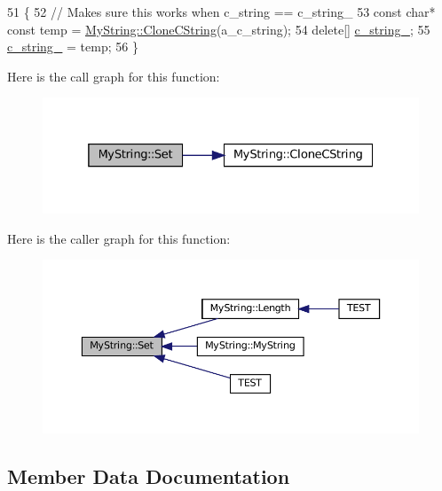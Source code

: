\begin{DoxyCode}
51                                          \{
52   \textcolor{comment}{// Makes sure this works when c\_string == c\_string\_}
53   \textcolor{keyword}{const} \textcolor{keywordtype}{char}* \textcolor{keyword}{const} temp = \hyperlink{classMyString_a40753dcfa3314a8993f32bdd75d67ce2}{MyString::CloneCString}(a\_c\_string);
54   \textcolor{keyword}{delete}[] \hyperlink{classMyString_a1872c0d04ff5f6e654161472b18bb9d0}{c\_string\_};
55   \hyperlink{classMyString_a1872c0d04ff5f6e654161472b18bb9d0}{c\_string\_} = temp;
56 \}
\end{DoxyCode}
Here is the call graph for this function\+:
\nopagebreak
\begin{figure}[H]
\begin{center}
\leavevmode
\includegraphics[width=325pt]{classMyString_a521c4cd7eccac6ce554d8a51505e4970_cgraph}
\end{center}
\end{figure}
Here is the caller graph for this function\+:
\nopagebreak
\begin{figure}[H]
\begin{center}
\leavevmode
\includegraphics[width=350pt]{classMyString_a521c4cd7eccac6ce554d8a51505e4970_icgraph}
\end{center}
\end{figure}


\subsection{Member Data Documentation}
\mbox{\label{classMyString_a1872c0d04ff5f6e654161472b18bb9d0}} 
